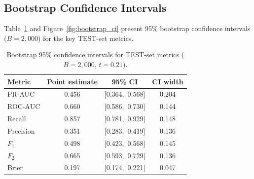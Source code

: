 \subsection{Bootstrap Confidence Intervals}
\label{subsec:results_bootstrap}

Table~\ref{tab:bootstrap_ci} and Figure~\ref{fig:bootstrap_ci} present 95\% bootstrap confidence intervals ($B\!=\!2{,}000$) for the key TEST-set metrics.

\begin{table}[ht!]
\centering
\caption[Bootstrap 95\% confidence intervals, TEST set]{Bootstrap 95\% confidence intervals for TEST-set metrics ($B\!=\!2{,}000$, $t\!=\!0.21$).}
\label{tab:bootstrap_ci}
\small
\begin{tabular}{l c c c}
\toprule
\textbf{Metric} & \textbf{Point estimate} & \textbf{95\% CI} & \textbf{CI width} \\
\midrule
PR-AUC    & 0.456 & [0.364,~0.568] & 0.204 \\
ROC-AUC   & 0.660 & [0.586,~0.730] & 0.144 \\
Recall    & 0.857 & [0.781,~0.929] & 0.148 \\
Precision & 0.351 & [0.283,~0.419] & 0.136 \\
$F_1$     & 0.498 & [0.423,~0.568] & 0.145 \\
$F_2$     & 0.665 & [0.593,~0.729] & 0.136 \\
Brier     & 0.197 & [0.174,~0.221] & 0.047 \\
\bottomrule
\end{tabular}
\end{table}

